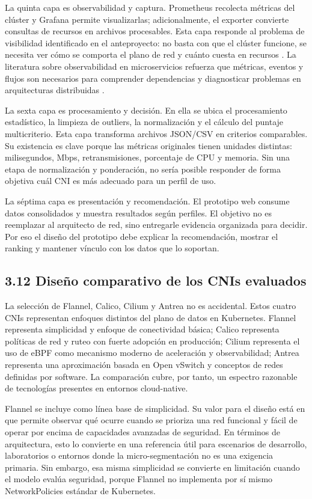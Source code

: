 La quinta capa es observabilidad y captura. Prometheus recolecta métricas del clúster y Grafana permite visualizarlas; adicionalmente, el exporter convierte consultas de recursos en archivos procesables. Esta capa responde al problema de visibilidad identificado en el anteproyecto: no basta con que el clúster funcione, se necesita ver cómo se comporta el plano de red y cuánto cuesta en recursos \cite{ref29}. La literatura sobre observabilidad en microservicios refuerza que métricas, eventos y flujos son necesarios para comprender dependencias y diagnosticar problemas en arquitecturas distribuidas \cite{ref6}.

La sexta capa es procesamiento y decisión. En ella se ubica el procesamiento estadístico, la limpieza de outliers, la normalización y el cálculo del puntaje multicriterio. Esta capa transforma archivos JSON/CSV en criterios comparables. Su existencia es clave porque las métricas originales tienen unidades distintas: milisegundos, Mbps, retransmisiones, porcentaje de CPU y memoria. Sin una etapa de normalización y ponderación, no sería posible responder de forma objetiva cuál CNI es más adecuado para un perfil de uso.

La séptima capa es presentación y recomendación. El prototipo web consume datos consolidados y muestra resultados según perfiles. El objetivo no es reemplazar al arquitecto de red, sino entregarle evidencia organizada para decidir. Por eso el diseño del prototipo debe explicar la recomendación, mostrar el ranking y mantener vínculo con los datos que lo soportan.

\subsection{3.12 Diseño comparativo de los CNIs evaluados}

La selección de Flannel, Calico, Cilium y Antrea no es accidental. Estos cuatro CNIs representan enfoques distintos del plano de datos en Kubernetes. Flannel representa simplicidad y enfoque de conectividad básica; Calico representa políticas de red y ruteo con fuerte adopción en producción; Cilium representa el uso de eBPF como mecanismo moderno de aceleración y observabilidad; Antrea representa una aproximación basada en Open vSwitch y conceptos de redes definidas por software. La comparación cubre, por tanto, un espectro razonable de tecnologías presentes en entornos cloud-native.

Flannel se incluye como línea base de simplicidad. Su valor para el diseño está en que permite observar qué ocurre cuando se prioriza una red funcional y fácil de operar por encima de capacidades avanzadas de seguridad. En términos de arquitectura, esto lo convierte en una referencia útil para escenarios de desarrollo, laboratorios o entornos donde la micro-segmentación no es una exigencia primaria. Sin embargo, esa misma simplicidad se convierte en limitación cuando el modelo evalúa seguridad, porque Flannel no implementa por sí mismo NetworkPolicies estándar de Kubernetes.

